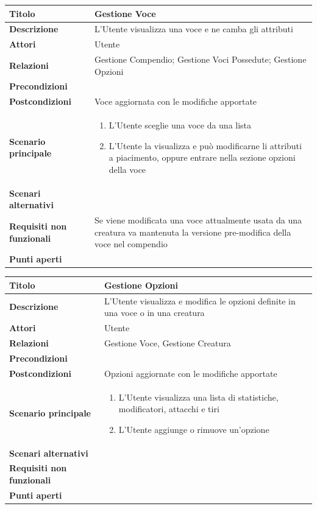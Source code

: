 \documentclass[a4paper, 11pt]{article}
\begin{document}
\begin{center}
\begin{tabular}{ |p{5cm}|p{9.5cm}|  }
\hline
\textbf{Titolo} & Gestione Voce \\
\hline
\textbf{Descrizione} & L'Utente visualizza una voce e ne camba gli attributi \\
\hline
\textbf{Attori} & Utente  \\
\hline
\textbf{Relazioni} & Gestione Compendio; Gestione Voci Possedute; Gestione Opzioni \\
\hline
\textbf{Precondizioni} &  \\
\hline
\textbf{Postcondizioni} & Voce aggiornata con le modifiche apportate \\
\hline
\textbf{Scenario principale} & 
\begin{enumerate}
    \item L'Utente sceglie una voce da una lista
    \item L'Utente la visualizza e può modificarne li attributi a piacimento, oppure entrare nella sezione opzioni della voce
\end{enumerate}
\\
\hline
\textbf{Scenari alternativi} & \\
\hline
    \textbf{Requisiti non funzionali} & Se viene modificata una voce attualmente usata da una creatura va mantenuta la versione pre-modifica della voce nel compendio \\
\hline
\textbf{Punti aperti} &  \\
\hline
\end{tabular}

\vspace{3em}

\begin{tabular}{ |p{5cm}|p{9.5cm}|  }
\hline
\textbf{Titolo} & Gestione Opzioni \\
\hline
\textbf{Descrizione} & L'Utente visualizza e modifica le opzioni definite in una voce o in una creatura \\
\hline
\textbf{Attori} & Utente  \\
\hline
\textbf{Relazioni} & Gestione Voce, Gestione Creatura \\
\hline
\textbf{Precondizioni} &  \\
\hline
\textbf{Postcondizioni} & Opzioni aggiornate con le modifiche apportate \\
\hline
\textbf{Scenario principale} & 
\begin{enumerate}
    \item L'Utente visualizza una lista di statistiche, modificatori, attacchi e tiri
    \item L'Utente aggiunge o rimuove un'opzione
\end{enumerate}
\\
\hline
\textbf{Scenari alternativi} & \\
\hline
    \textbf{Requisiti non funzionali} & \\
\hline
\textbf{Punti aperti} &  \\
\hline
\end{tabular}


\end{center}
\end{document}
